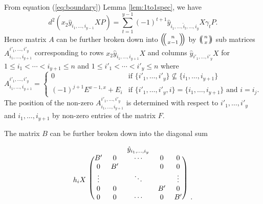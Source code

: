 \documentclass{article}
\theoremstyle{plain}
\theoremstyle{definition}
\numberwithin{thm}{section}
\begin{document}
				From equation (\ref{eq:boundary}) Lemma \ref{lem:1to1spec}, we have
				\begin{equation*}
					d^2(x_2\hat{y}_{i_1,\dots,i_{y-1}}XP)=\sum_{t=1}^{y-1}{(-1)^{t+1}\hat{y}_{i_1,\dots,\hat{i}_t,\dots,i_y}X\gamma_tP}.
				\end{equation*}
				Hence matrix $A$ can be further broken down into ${\ensuremath{\left(\kern-.3em\left(\genfrac{}{}{0pt}{}{{n}}{{x-1}}\right)\kern-.3em\right)}}$ by ${\ensuremath{\left(\kern-.3em\left(\genfrac{}{}{0pt}{}{{n}}{{x}}\right)\kern-.3em\right)}}$ sub matrices $A_{i_1,\dots,i_{y+1}}^{{i'}_1,\dots,{i'}_y}$
				corresponding to rows $x_2\hat{y}_{i_1,\dots,i_{y+1}}X$ and columns $\hat{y}_{{i'}_1,\dots,{i'}_y}X$
				for $1\leq i_1<\cdots<i_{y+1}\leq n$ and $1\leq {i'}_1<\cdots<{i'}_y\leq n$ where
				\begin{equation*}
					A_{i_1,\dots,i_{y+1}}^{{i'}_1,\dots,{i'}_y}=
					\begin{cases}
								0 		&\mbox{if  }  \{ {i'}_1,\dots,{i'}_y \} \nsubseteq \{ i_1,\dots,i_{y+1} \}
								\\
								(-1)^{j+1}E^{x-1,x}+E_i &\text{if  }  \{ {i'}_1,\dots,{i'}_y,i \} = \{ i_1,\dots,i_{y+1} \} \text{ and } i=i_j
								.
						\end{cases}
				\end{equation*}
				The position of the non-zero $A_{i_1,\dots,i_{y+1}}^{{i'}_1,\dots,{i'}_y}$ is determined with respect to ${i'}_1,\dots,{i'}_y$ and $i_1,\dots,i_{y+1}$
				by non-zero entries of the matrix $F$.
				
				The matrix $B$ can be further broken down into the diagonal sum
				
				\[
					\begin{blockarray}{ccccccc}
						 &  &  & \hat{y}_{i_1,\dots,i_y} &  & & \\
						\begin{block}{c(ccccc)c}
										& {B'}   & {0}	 & \cdots	& {0}	 & {0}	&\\
										& {0}	   & {B'}  & 				& {0}	 & {0}	 &\\
							{h_iX}& \vdots & 			 & \ddots & 		 & \vdots	&\\
										& {0}	   & 	{0}  & 				& {B'} & {0}		 &\\
										& {0}	   & 	{0}  & \cdots & {0}	 & {B'} 		&.\\
						\end{block}
					\end{blockarray}
					\]
				
\end{document}
